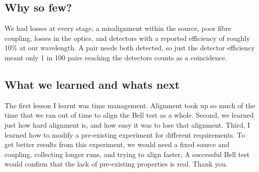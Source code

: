 \documentclass{article}
\begin{document}
\subsection{Why so few?}
We had losses at every stage, a misalignment within the source, poor fibre coupling, losses in the optics, and detectors with a reported efficiency of roughly 10\% at our wavelength. A pair needs both detected, so just the detector efficiency meant only 1 in 100 pairs reaching the detectors counts as a coincidence.

\subsection{What we learned and whats next}
The first lesson I learnt was time management. Alignment took up so much of the time that we ran out of time to align the Bell test as a whole. Second, we learned just how hard alignment is, and how easy it was to lose that alignment. Third, I learned how to modify a pre-existing experiment for different requirements. To get better results from this experiment, we would need a fixed source and coupling, collecting longer runs, and trying to align faster. A successful Bell test would confirm that the lack of pre-existing properties is real. Thank you.
\end{document}
